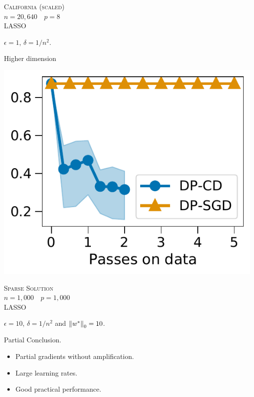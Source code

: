 \documentclass{beamer}
\begin{document}
\begin{frame}
\begin{minipage}{0.5\linewidth}
    \begin{center}
      \normalsize
      \textsc{California (scaled)} \\
      $n=20,640$~~$p=8$ \\
      LASSO
    \end{center}
  \end{minipage}

  \vspace{1em}

  \begin{center}
    \Large $\epsilon = 1$, $\delta = 1 / n^2$.
  \end{center}
\end{frame}


\begin{frame}
  \begin{center}
    \Huge Higher dimension
  \end{center}

  \pause

  \vspace{1em}

  \begin{minipage}{\linewidth}
    \centering
    \includegraphics[width=0.5\linewidth]{images/optimization_lasso.pdf}
  \end{minipage}
  \begin{center}
    \normalsize
    \textsc{Sparse Solution} \\
    $n=1,000$~~$p=1,000$ \\
    LASSO
  \end{center}

  \vspace{0.5em}

  \begin{center}
    \Large $\epsilon = 10$, $\delta = 1 / n^2$ and $\left \lVert w^* \right \rVert_0 = 10$.
  \end{center}
\end{frame}

\begin{frame}
  { \Huge
  \begin{center}
    Partial Conclusion.
  \end{center}
  }
  \begin{itemize}
  \item Partial gradients without amplification.
  \item Large learning rates.
  \item Good practical performance.
  \end{itemize}
\end{frame}
\end{document}
